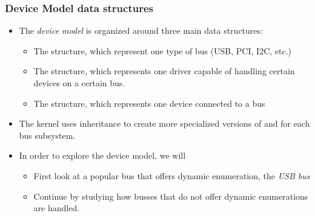 \begin{frame}
  \frametitle{Device Model data structures}
  \begin{itemize}
  \item The {\em device model} is organized around three main data
    structures:
    \begin{itemize}
    \item The  structure, which represent one type of bus
      (USB, PCI, I2C, etc.)
    \item The  structure, which represents one driver
      capable of handling certain devices on a certain bus.
    \item The  structure, which represents one device
      connected to a bus
    \end{itemize}
  \item The kernel uses inheritance to create more specialized
    versions of  and 
    for each bus subsystem.
  \item In order to explore the device model, we will
    \begin{itemize}
    \item First look at a popular bus that offers dynamic enumeration,
      the {\em USB bus}
    \item Continue by studying how busses that do not offer dynamic
      enumerations are handled.
    \end{itemize}
  \end{itemize}
\end{frame}

